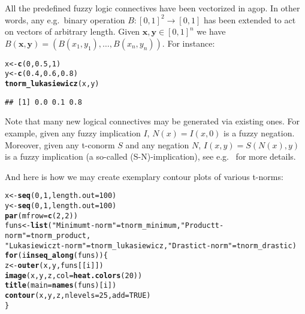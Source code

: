\documentclass[11pt]{article}\usepackage[]{graphicx}\usepackage[]{color}
\makeatletter
\newcommand{\hlnum}[1]{\textcolor[rgb]{0.686,0.059,0.569}{#1}}%
\newcommand{\hlstr}[1]{\textcolor[rgb]{0.192,0.494,0.8}{#1}}%
\newcommand{\hlstd}[1]{\textcolor[rgb]{0.345,0.345,0.345}{#1}}%
\newcommand{\hlkwa}[1]{\textcolor[rgb]{0.161,0.373,0.58}{\textbf{#1}}}%
\newcommand{\hlkwb}[1]{\textcolor[rgb]{0.69,0.353,0.396}{#1}}%
\newcommand{\hlkwc}[1]{\textcolor[rgb]{0.333,0.667,0.333}{#1}}%
\newcommand{\hlkwd}[1]{\textcolor[rgb]{0.737,0.353,0.396}{\textbf{#1}}}%
\newenvironment{kframe}{%
 \def\at@end@of@kframe{}%
 \ifinner\ifhmode%
  \def\at@end@of@kframe{\end{minipage}}%
  \begin{minipage}{\columnwidth}%
 \fi\fi%
 \def\FrameCommand##1{\hskip\@totalleftmargin \hskip-\fboxsep
 \colorbox{shadecolor}{##1}\hskip-\fboxsep
     \hskip-\linewidth \hskip-\@totalleftmargin \hskip\columnwidth}%
 \MakeFramed {\advance\hsize-\width
   \@totalleftmargin\z@ \linewidth\hsize
   \@setminipage}}%
 {\par\unskip\endMakeFramed%
 \at@end@of@kframe}
\newenvironment{knitrout}{}{} %
\newcommand{\package}[1]{\textsf{#1}\xspace}
\newcommand{\vect}[1]{{\mathbf{#1}}}
\theoremstyle{remark}
\theoremstyle{definition}
\makeatother
\begin{document}
All the predefined fuzzy logic connectives have been vectorized in \package{agop}.
In other words, any e.g.~binary operation $B: [0,1]^2\to [0,1]$ has
been extended to act on vectors of arbitrary length.
Given $\vect{x},\vect{y}\in[0,1]^n$ we have
$B(\vect{x},\vect{y})=(B(x_1, y_1), \dots, B(x_n, y_n))$.
For instance:

\begin{knitrout}\small
{}\color{fgcolor}\begin{kframe}
\begin{alltt}
\hlstd{x} \hlkwb{<-} \hlkwd{c}\hlstd{(}\hlnum{0}\hlstd{,} \hlnum{0.5}\hlstd{,} \hlnum{1}\hlstd{)}
\hlstd{y} \hlkwb{<-} \hlkwd{c}\hlstd{(}\hlnum{0.4}\hlstd{,} \hlnum{0.6}\hlstd{,} \hlnum{0.8}\hlstd{)}
\hlkwd{tnorm_lukasiewicz}\hlstd{(x, y)}
\end{alltt}
\begin{verbatim}
## [1] 0.0 0.1 0.8
\end{verbatim}
\end{kframe}
\end{knitrout}

Note that many new logical connectives may be generated via existing ones.
For example, given any fuzzy implication $I$, $N(x)=I(x,0)$ is a fuzzy negation.
Moreover, given any t-conorm $S$ and any negation $N$, $I(x, y)=S(N(x), y)$
is a fuzzy implication (a so-called (S-N)-implication),
see e.g.~\cite{BaczynskiJayaram2008:fuzzyimplications} for more details.

And here is how we may create exemplary contour plots of various t-norms:

\begin{knitrout}\small
{}\color{fgcolor}\begin{kframe}
\begin{alltt}
\hlstd{x} \hlkwb{<-} \hlkwd{seq}\hlstd{(}\hlnum{0}\hlstd{,} \hlnum{1}\hlstd{,} \hlkwc{length.out}\hlstd{=}\hlnum{100}\hlstd{)}
\hlstd{y} \hlkwb{<-} \hlkwd{seq}\hlstd{(}\hlnum{0}\hlstd{,} \hlnum{1}\hlstd{,} \hlkwc{length.out}\hlstd{=}\hlnum{100}\hlstd{)}
\hlkwd{par}\hlstd{(}\hlkwc{mfrow}\hlstd{=}\hlkwd{c}\hlstd{(}\hlnum{2}\hlstd{,}\hlnum{2}\hlstd{))}
\hlstd{funs} \hlkwb{<-} \hlkwd{list}\hlstd{(}\hlstr{"Minimum t-norm"}\hlstd{=tnorm_minimum,} \hlstr{"Product t-norm"}\hlstd{=tnorm_product,}
             \hlstr{"Lukasiewicz t-norm"}\hlstd{=tnorm_lukasiewicz,} \hlstr{"Drastic t-norm"}\hlstd{=tnorm_drastic)}
\hlkwa{for} \hlstd{(i} \hlkwa{in} \hlkwd{seq_along}\hlstd{(funs)) \{}
   \hlstd{z} \hlkwb{<-} \hlkwd{outer}\hlstd{(x, y, funs[[i]])}
   \hlkwd{image}\hlstd{(x, y, z,} \hlkwc{col}\hlstd{=}\hlkwd{heat.colors}\hlstd{(}\hlnum{20}\hlstd{))}
   \hlkwd{title}\hlstd{(}\hlkwc{main}\hlstd{=}\hlkwd{names}\hlstd{(funs)[i])}
   \hlkwd{contour}\hlstd{(x, y, z,} \hlkwc{nlevels}\hlstd{=}\hlnum{25}\hlstd{,} \hlkwc{add}\hlstd{=}\hlnum{TRUE}\hlstd{)}
\hlstd{\}}
\end{alltt}
\end{kframe}
\end{knitrout}
\end{document}
